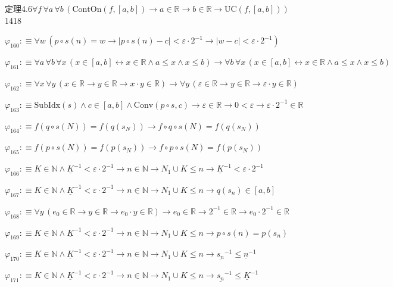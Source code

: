 \begin{fullproof}{定理4.6}{$\forall f\,\forall a\,\forall b\,(\mathrm{ContOn}(f,[a,b]) \to a \in \mathbb{R} \to b \in \mathbb{R} \to \mathrm{UC}(f,[a,b]))$}{1418}
\begin{abbrevlist}
\item $\varphi_{160} :\equiv \forall w\,(p \circ s(n) = w \to \lvert p \circ s(n) - c \rvert < \varepsilon \cdot 2^{-1} \to \lvert w - c \rvert < \varepsilon \cdot 2^{-1})$
\item $\varphi_{161} :\equiv \forall a\,\forall b\,\forall x\,(x \in [a,b] \leftrightarrow x \in \mathbb{R} \land a \leq x \land x \leq b) \to \forall b\,\forall x\,(x \in [a,b] \leftrightarrow x \in \mathbb{R} \land a \leq x \land x \leq b)$
\item $\varphi_{162} :\equiv \forall x\,\forall y\,(x \in \mathbb{R} \to y \in \mathbb{R} \to x \cdot y \in \mathbb{R}) \to \forall y\,(\varepsilon \in \mathbb{R} \to y \in \mathbb{R} \to \varepsilon \cdot y \in \mathbb{R})$
\item $\varphi_{163} :\equiv \mathrm{SubIdx}(s) \land c \in [a,b] \land \mathrm{Conv}(p \circ s,c) \to \varepsilon \in \mathbb{R} \to 0 < \varepsilon \to \varepsilon \cdot 2^{-1} \in \mathbb{R}$
\item $\varphi_{164} :\equiv f(q \circ s(N)) = f(q(s_{N})) \to f \circ q \circ s(N) = f(q(s_{N}))$
\item $\varphi_{165} :\equiv f(p \circ s(N)) = f(p(s_{N})) \to f \circ p \circ s(N) = f(p(s_{N}))$
\item $\varphi_{166} :\equiv K \in \mathbb{N} \land \underline{K}^{-1} < \varepsilon \cdot 2^{-1} \to n \in \mathbb{N} \to N_{1} \cup K \leq n \to \underline{K}^{-1} < \varepsilon \cdot 2^{-1}$
\item $\varphi_{167} :\equiv K \in \mathbb{N} \land \underline{K}^{-1} < \varepsilon \cdot 2^{-1} \to n \in \mathbb{N} \to N_{1} \cup K \leq n \to q(s_{n}) \in [a,b]$
\item $\varphi_{168} :\equiv \forall y\,(e_{0} \in \mathbb{R} \to y \in \mathbb{R} \to e_{0} \cdot y \in \mathbb{R}) \to e_{0} \in \mathbb{R} \to 2^{-1} \in \mathbb{R} \to e_{0} \cdot 2^{-1} \in \mathbb{R}$
\item $\varphi_{169} :\equiv K \in \mathbb{N} \land \underline{K}^{-1} < \varepsilon \cdot 2^{-1} \to n \in \mathbb{N} \to N_{1} \cup K \leq n \to p \circ s(n) = p(s_{n})$
\item $\varphi_{170} :\equiv K \in \mathbb{N} \land \underline{K}^{-1} < \varepsilon \cdot 2^{-1} \to n \in \mathbb{N} \to N_{1} \cup K \leq n \to \underline{s_{n}}^{-1} \leq \underline{n}^{-1}$
\item $\varphi_{171} :\equiv K \in \mathbb{N} \land \underline{K}^{-1} < \varepsilon \cdot 2^{-1} \to n \in \mathbb{N} \to N_{1} \cup K \leq n \to \underline{s_{n}}^{-1} \leq \underline{K}^{-1}$

\end{abbrevlist}
\end{fullproof}
